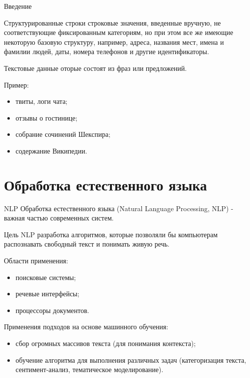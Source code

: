 \documentclass{beamer}
\begin{document}
\begin{frame}{Введение}
\begin{block}{Структурированные строки}
строковые значения, введенные вручную, не соответствующие фиксированным категориям, но при этом все же имеющие некоторую базовую структуру, например, адреса, названия мест, имена и фамилии людей, даты, номера телефонов и другие идентификаторы.
\end{block}
\begin{block}{Текстовые данные}
оторые состоят из фраз или предложений. 
\end{block}
Пример:
\begin{itemize}
\item твиты, логи чата;
\item отзывы о гостинице;
\item собрание сочинений Шекспира;
\item содержание Википедии.
\end{itemize}
\end{frame}

\section{Обработка естественного языка}

\begin{frame}{NLP}
Обработка естественного языка (Natural Language Processing, NLP) - важная частью современных систем. 
\begin{block}{Цель NLP}
разработка алгоритмов, которые позволяли бы компьютерам распознавать свободный текст и понимать живую речь. 
\end{block}
Области применения:
\begin{itemize}
\item поисковые системы;
\item речевые интерфейсы;
\item процессоры документов.
\end{itemize}
Применения подходов на основе машинного обучения: 
\begin{itemize}
\item сбор огромных массивов текста (для понимания контекста);
\item обучение алгоритма для выполнения различных задач (категоризация текста, сентимент-анализ,  тематическое моделирование).
\end{itemize}
\end{frame}
\end{document}
